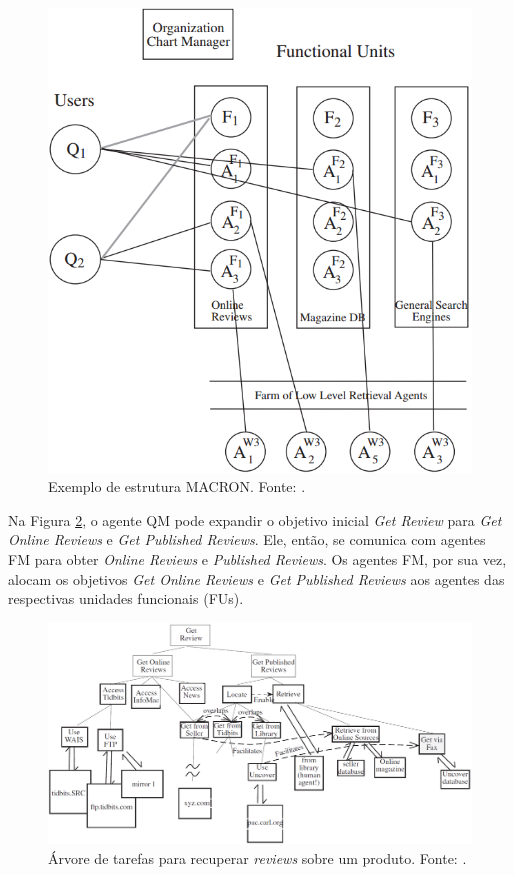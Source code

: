 \begin{description}
\begin{figure}[h!]
    \centering
    \includegraphics[scale=0.4]{figuras/macron/macron.png}
    \caption{Exemplo de estrutura MACRON. Fonte: .}
    \label{fig:macron}
\end{figure}

\newpage

Na Figura \ref{fig:macron_example}, o agente QM pode expandir o objetivo inicial \textit{Get Review} para \textit{Get Online Reviews} e \textit{Get Published Reviews}. Ele, então, se comunica com agentes FM para obter \textit{Online Reviews} e \textit{Published Reviews}. Os agentes FM, por sua vez, alocam os objetivos \textit{Get Online Reviews} e \textit{Get Published Reviews} aos agentes das respectivas unidades funcionais (FUs).

\begin{figure}[h!]
    \centering
    \includegraphics[scale=0.6]{figuras/macron/macron_example.png}
    \caption{Árvore de tarefas para recuperar \textit{reviews} sobre um produto.  Fonte: .}
    \label{fig:macron_example}
\end{figure}


\end{description}
